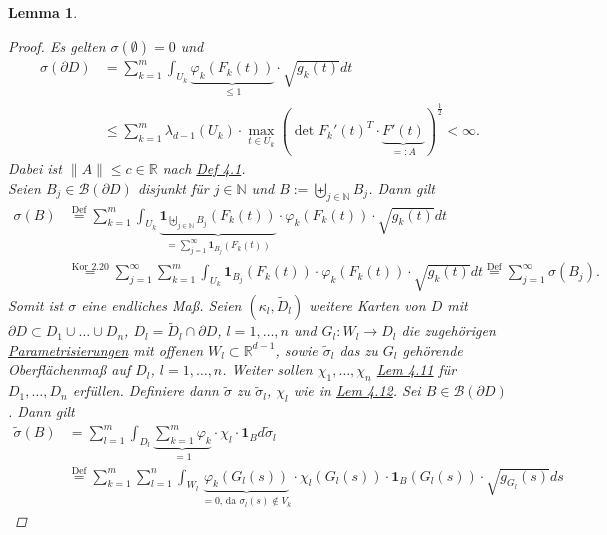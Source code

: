 \documentclass[a4paper]{report}
\newcommand{\doubleOne}{\textbf{1}}
\newcommand{\R}{\mathbb{R}}
\newcommand{\N}{\mathbb{N}}
\newcommand{\Borel}{\mathcal{B}}
\newcommand{\bigdcup}{\biguplus}
\newcommand{\jshortlink}[1]{\jhyperref{#1}{\text{#1}}}
\newcommand{\jhyperref}[2]{\hyperref[j_#1]{#2}}
\newcommand{\jlink}[1]{\jhyperref{#1}{#1}}
\newcommand{\jabb}[3]{ #1: #2 \rightarrow #3 }
\theoremstyle{plain}
\newtheorem{lem}[thm]{Lemma}
\theoremstyle{definition}
\begin{document}
{{{{\begin{lem}
    \begin{proof}
        Es gelten $\sigma(\emptyset)=0$ und
        \[
            \begin{split}
                \sigma(\partial D) &= \sum_{k=1}^m \int_{U_k} \underbrace{\varphi_k(F_k(t))}_{\le 1} \cdot \sqrt{g_k(t)}dt \\
                                   &\le \sum_{k=1}^m \lambda_{d-1}(U_k)\cdot \max_{t\in U_k}(\det F_k'(t)^T \cdot \underbrace{F'(t)}_{=:A})^\frac{1}{2}
                                   < \infty.
            \end{split}
        \]
        Dabei ist $\lVert A \rVert \le c \in \R$ nach \jlink{Def 4.1}.\\
        Seien $B_j\in \Borel(\partial D)$ disjunkt für $j\in\N$ und $B:= \bigdcup_{j\in\N} B_j$. Dann gilt
        \[
            \begin{split}
                \sigma(B) &\overset{\text{Def}}{=} \sum_{k=1}^m \int_{U_k} \underbrace{\doubleOne_{\bigdcup_{j\in\N} B_j} (F_k(t))}_{=\sum_{j=1}^\infty\doubleOne_{B_j}(F_k(t))} \cdot \varphi_k(F_k(t)) \cdot \sqrt{g_k(t)} dt\\
                          &\overset{\jshortlink{Kor 2.20}}{=} \sum_{j=1}^\infty \sum_{k=1}^m \int_{U_k} \doubleOne_{B_j} (F_k(t))\cdot \varphi_k(F_k(t))\cdot \sqrt{g_k(t)} dt \overset{\text{Def}}{=} \sum_{j=1}^\infty \sigma(B_j).
            \end{split}
        \]
        Somit ist $\sigma$ eine endliches Maß. Seien $(\kappa_l, \tilde{D}_l)$ weitere Karten von $D$ mit $\partial D \subset D_1\cup \dots \cup D_n$, $D_l = \tilde{D}_l\cap \partial D$, $l=1,\dots,n$ und $\jabb{G_l}{W_l}{D_l}$ die zugehörigen \jhyperref{Parametrisierung}{Parametrisierungen} mit offenen $W_l \subset \R^{d-1}$, sowie $\tilde{\sigma}_l$ das zu $G_l$ gehörende Oberflächenmaß auf $D_l$, $l=1,\dots,n$. Weiter sollen $\chi_1,\dots,\chi_n$ \jlink{Lem 4.11} für $D_1, \dots, D_n$ erfüllen. Definiere dann $\tilde{\sigma}$ zu $\tilde{\sigma}_l$, $\chi_l$ wie in \jlink{Lem 4.12}. Sei $B\in \Borel(\partial D)$. Dann gilt
        \[
            \tag{$*$}
            \begin{split}
                \tilde{\sigma}(B) &= \sum_{l=1}^m \int_{D_l} \underbrace{\sum_{k=1}^m \varphi_k}_{=1} \cdot \chi_l \cdot \doubleOne_B d\tilde{\sigma}_l\\
                &\overset{\text{Def}}{=} \sum_{k=1}^m \sum_{l=1}^n \int_{W_l} \underbrace{\varphi_k(G_l(s))}_{=0\text{, da }\sigma_l(s)\notin V_k} \cdot \chi_l(G_l(s)) \cdot \doubleOne_B(G_l(s)) \cdot \sqrt{g_{G_l}(s)} ds

\end{split}\]
\end{proof}
\end{lem}}}}}
\end{document}

